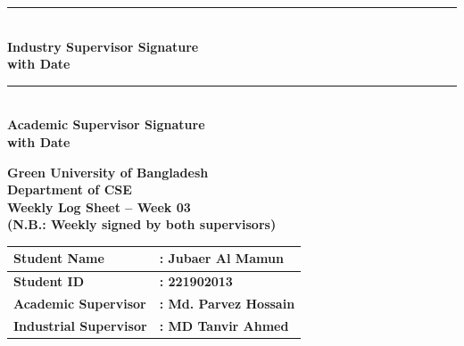 \documentclass[a4paper,11pt]{article}
\begin{document}
\noindent
\begin{minipage}[t]{0.45\textwidth}
\rule{0.8\textwidth}{0.4pt} \\
\textbf{Industry Supervisor Signature} \\
\textbf{with Date}
\end{minipage}
\hfill
\begin{minipage}[t]{0.45\textwidth}
\rule{0.8\textwidth}{0.4pt} \\
\textbf{Academic Supervisor Signature} \\
\textbf{with Date}
\end{minipage}

\newpage

\begin{center}
    {\Large \textbf{Green University of Bangladesh}} \\[0.5em]
    {\large \textbf{Department of CSE}} \\[0.5em]
    {\large \textbf{Weekly Log Sheet -- Week 03}} \\[0.5em]
    {\color{red} \textbf{(N.B.: Weekly signed by both supervisors)}}
\end{center}

\vspace{1em}

\begin{tabularx}{\textwidth}{|l|X|}
\hline
\textbf{Student Name} & \textbf{: Jubaer Al Mamun} \\ \hline
\textbf{Student ID} & \textbf{: 221902013} \\ \hline
\textbf{Academic Supervisor} & \textbf{: Md. Parvez Hossain} \\ \hline
\textbf{Industrial Supervisor} & \textbf{: MD Tanvir Ahmed} \\ \hline
\end{tabularx}

\vspace{1em}
\end{document}
